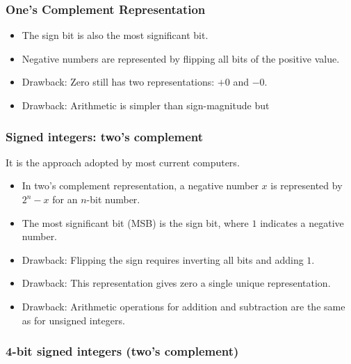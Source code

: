 \documentclass[12pt]{article}
\begin{document}
\subsubsection{One's Complement Representation}
\begin{itemize}
    \item The sign bit is also the most significant bit.
    \item Negative numbers are represented by flipping all bits of the positive value.
    \item Drawback: Zero still has two representations: $+0$ and $-0$.
    \item Drawback: Arithmetic is simpler than sign-magnitude but 
\end{itemize}


\subsubsection{Signed integers: two's complement}
It is the approach adopted by most current computers.
\begin{itemize}
    \item In two's complement representation, a negative number \( x \) is represented by \( 2^n - x \) for an \( n \)-bit number.
    \item The most significant bit (MSB) is the sign bit, where \( 1 \) indicates a negative number.
    \item Drawback: Flipping the sign requires inverting all bits and adding \( 1 \).
    \item Drawback: This representation gives zero a single unique representation.
    \item Drawback: Arithmetic operations for addition and subtraction are the same as for unsigned integers.
\end{itemize}





\subsubsection{4-bit signed integers (two's complement)}
\end{document}
